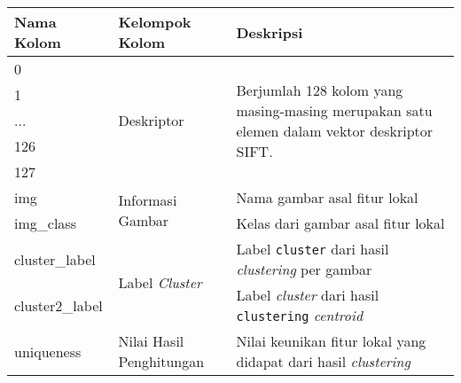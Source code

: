 \begin{table}[H]
	\begin{tabular}{|p{}|p{}|p{}|}
		\hline
		Nama Kolom      & Kelompok Kolom                            & Deskripsi                                                                                                   \\ \hline
		0               & \multirow{5}{0.45\textwidth}{Deskriptor}               & \multirow{5}{0.45\textwidth}{Berjumlah 128 kolom yang masing-masing merupakan satu elemen dalam vektor deskriptor SIFT.} \\ \cline{1-1}
		1               &                                           &                                                                                                             \\ \cline{1-1}
		...             &                                           &                                                                                                             \\ \cline{1-1}
		126             &                                           &                                                                                                             \\ \cline{1-1}
		127             &                                           &                                                                                                             \\ \hline
		img             & \multirow{2}{*}{Informasi Gambar}         & Nama gambar asal fitur lokal                                                                                \\ \cline{1-1} \cline{3-3} 
		img\_class      &                                           & Kelas dari gambar asal fitur lokal                                                                          \\ \hline
		cluster\_label  & \multirow{2}{*}{Label \textit{Cluster}}            & Label \texttt{cluster} dari hasil \textit{clustering} per gambar                                                              \\ \cline{1-1} \cline{3-3} 
		cluster2\_label &                                           & Label \textit{cluster} dari hasil \texttt{clustering} \textit{centroid}                                                                \\ \hline
		uniqueness      & \multirow{2}{*}{Nilai Hasil Penghitungan} & Nilai keunikan fitur lokal yang didapat dari hasil \textit{clustering}                                               \\ \cline{1-1} \cline{3-3} 

\end{tabular}
\end{table}
